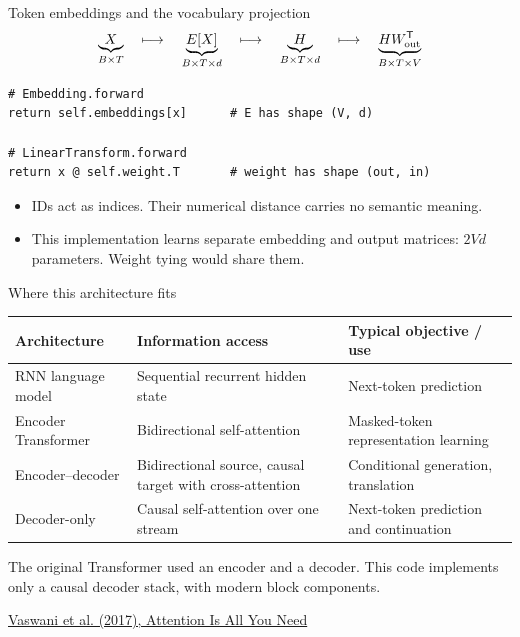 \documentclass[11pt,aspectratio=169]{beamer}
\newcommand{\paper}[2]{\par{\scriptsize\color{muted}\href{#2}{#1}\par}}
\begin{document}
\begin{frame}[fragile]{Token embeddings and the vocabulary projection}
\[
\underbrace{X}_{B\times T}\quad\longmapsto\quad
\underbrace{E[X]}_{B\times T\times d}\quad\longmapsto\quad
\underbrace{H}_{B\times T\times d}\quad\longmapsto\quad
\underbrace{HW_{\rm out}^{\mathsf T}}_{B\times T\times V}
\]
\begin{lstlisting}
# Embedding.forward
return self.embeddings[x]      # E has shape (V, d)

# LinearTransform.forward
return x @ self.weight.T       # weight has shape (out, in)
\end{lstlisting}
\begin{itemize}
\item IDs act as indices. Their numerical distance carries no semantic meaning.
\item This implementation learns separate embedding and output matrices: $2Vd$ parameters. Weight tying would share them.
\end{itemize}
\end{frame}

\begin{frame}{Where this architecture fits}
\small
\begin{tabular}{@{}>{\raggedright\arraybackslash}p{}>{\raggedright\arraybackslash}p{}>{\raggedright\arraybackslash}p{}@{}}
\toprule
Architecture & Information access & Typical objective / use\\\midrule
RNN language model & Sequential recurrent hidden state & Next-token prediction\\[3mm]
Encoder Transformer & Bidirectional self-attention & Masked-token representation learning\\[3mm]
Encoder--decoder & Bidirectional source, causal target with cross-attention & Conditional generation, translation\\[3mm]
Decoder-only & Causal self-attention over one stream & Next-token prediction and continuation\\\bottomrule
\end{tabular}\par
\par\vspace{3mm}
The original Transformer used an encoder and a decoder. This code implements only a causal decoder stack, with modern block components.
\paper{Vaswani et al. (2017), Attention Is All You Need}{https://arxiv.org/abs/1706.03762}
\end{frame}
\end{document}

